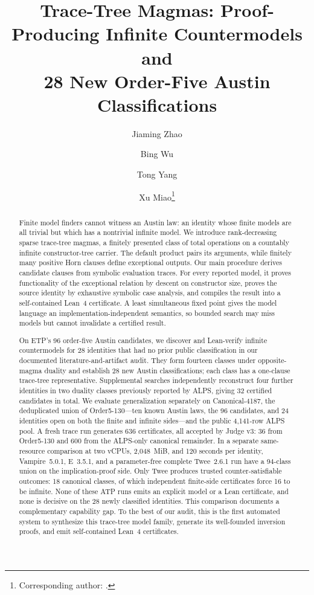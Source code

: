 \documentclass[runningheads]{llncs}
\title{Trace-Tree Magmas: Proof-Producing Infinite Countermodels and\texorpdfstring{\\}{: }
28 New Order-Five Austin Classifications}
\author{Jiaming Zhao\inst{1,2} \and
  Bing Wu\inst{1} \and
  Tong Yang\inst{2} \and
  Xu Miao\inst{1}\thanks{Corresponding author: \email{miaoxu@zetyun.com}.}}
\institute{Yanbiao Lab, DataCanvas Co., Ltd., Beijing, China
  \and Peking University, Beijing, China}
\begin{document}
\maketitle

\begin{abstract}
Finite model finders cannot witness an Austin law: an identity whose finite
models are all trivial but which has a nontrivial infinite model.  We introduce
rank-decreasing sparse trace-tree magmas, a finitely presented class of total
operations on a countably infinite constructor-tree carrier.  The default
product pairs its arguments, while finitely many positive Horn clauses define
exceptional outputs.  Our main procedure derives candidate clauses from
symbolic evaluation traces.  For every reported model, it proves functionality
of the exceptional relation by descent on constructor size, proves the source
identity by exhaustive symbolic case analysis, and compiles the result into a
self-contained Lean~4 certificate.  A least simultaneous fixed point gives the
model language an implementation-independent semantics, so bounded search may
miss models but cannot invalidate a certified result.

On ETP's 96 order-five Austin candidates, we discover and Lean-verify infinite
countermodels for 28 identities that had no prior public classification in our
documented literature-and-artifact audit.  They form fourteen classes under
opposite-magma duality and establish 28 new Austin classifications; each class
has a one-clause trace-tree representative.  Supplemental
searches independently reconstruct four further identities in two duality
classes previously reported by ALPS, giving 32 certified candidates in total.
We evaluate generalization separately on Canonical-4187, the deduplicated union
of Order5-130---ten known Austin laws, the 96 candidates, and 24 identities open
on both the finite and infinite sides---and the public 4,141-row ALPS pool.  A
fresh trace run generates 636 certificates, all accepted by Judge v3: 36 from
Order5-130 and 600 from the ALPS-only canonical remainder.  In a separate
same-resource comparison at two vCPUs, 2,048~MiB, and 120 seconds per identity,
Vampire~5.0.1, E~3.5.1, and a parameter-free complete Twee~2.6.1 run have a
94-class union on the implication-proof side.  Only Twee produces trusted
counter-satisfiable outcomes: 18 canonical classes, of which independent
finite-side certificates force 16 to be infinite.  None of these ATP runs
emits an explicit model or a Lean certificate, and none is decisive on the 28
newly classified identities.  This comparison documents a complementary
capability gap.  To the best of our
audit, this is the first automated system to synthesize this trace-tree model
family, generate its well-founded inversion proofs, and emit self-contained
Lean~4 certificates.

\end{abstract}
\end{document}

